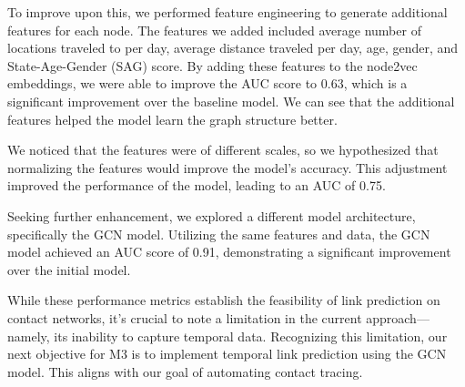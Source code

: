 \documentclass[times, 10pt,twocolumn]{article}
\begin{document}
To improve upon this, we performed feature engineering to generate additional features for each node. The features we added included average number of locations traveled to per day, average distance traveled per day, age, gender, and State-Age-Gender (SAG) score. By adding these features to the node2vec embeddings, we were able to improve the AUC score to 0.63, which is a significant improvement over the baseline model. We can see that the additional features helped the model learn the graph structure better. 


We noticed that the features were of different scales, so we hypothesized that normalizing the features would improve the model's accuracy. This adjustment improved the performance of the model, leading to an AUC of 0.75.

Seeking further enhancement, we explored a different model architecture, specifically the GCN model. Utilizing the same features and data, the GCN model achieved an AUC score of 0.91, demonstrating a significant improvement over the initial model.


While these performance metrics establish the feasibility of link prediction on contact networks, it's crucial to note a limitation in the current approach—namely, its inability to capture temporal data. Recognizing this limitation, our next objective for M3 is to implement temporal link prediction using the GCN model. This aligns with our goal of automating contact tracing.

\end{document}
